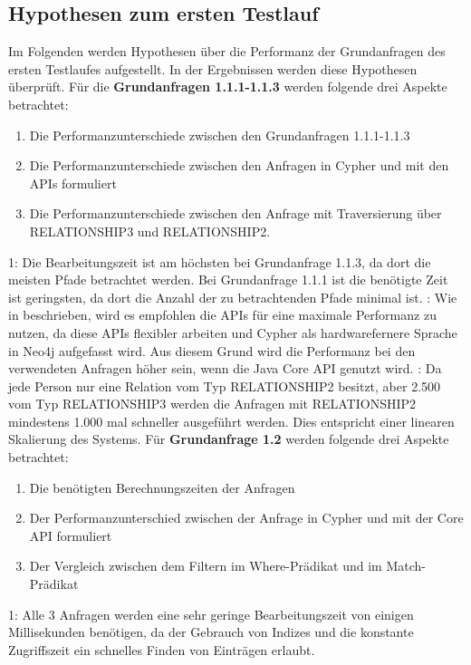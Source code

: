 \subsection{Hypothesen zum ersten Testlauf}
Im Folgenden werden Hypothesen über die Performanz der Grundanfragen des ersten Testlaufes aufgestellt. In der Ergebnissen werden diese Hypothesen überprüft. \newline \newline
Für die \textbf{Grundanfragen 1.1.1-1.1.3} werden folgende drei Aspekte betrachtet:
\begin{enumerate}
\item Die Performanzunterschiede zwischen den Grundanfragen 1.1.1-1.1.3
\item Die Performanzunterschiede zwischen den Anfragen in Cypher und mit den APIs formuliert
\item Die Performanzunterschiede zwischen den Anfrage mit Traversierung über RELATIONSHIP3 und RELATIONSHIP2.
\end{enumerate}
1: Die Bearbeitungszeit ist am höchsten bei Grundanfrage 1.1.3, da dort die meisten Pfade betrachtet werden. Bei Grundanfrage 1.1.1 ist die benötigte Zeit ist geringsten, da dort die Anzahl der zu betrachtenden Pfade minimal ist. : Wie in \parencite{raj2015neo4j} beschrieben, wird es empfohlen die APIs für eine maximale Performanz zu nutzen, da diese APIs flexibler arbeiten und Cypher als hardwarefernere Sprache in Neo4j aufgefasst wird. Aus diesem Grund wird die Performanz bei den verwendeten Anfragen höher sein, wenn die Java Core API genutzt wird. : Da jede Person nur eine Relation vom Typ RELATIONSHIP2 besitzt, aber 2.500 vom Typ RELATIONSHIP3 werden die Anfragen mit RELATIONSHIP2 mindestens 1.000 mal schneller ausgeführt werden. Dies entspricht einer linearen Skalierung des Systems. \newline \newline
Für \textbf{Grundanfrage 1.2} werden folgende drei Aspekte betrachtet:
\begin{enumerate}
	\item Die benötigten Berechnungszeiten der Anfragen 
	\item Der Performanzunterschied zwischen der Anfrage in Cypher und mit der Core API formuliert
	\item Der Vergleich zwischen dem Filtern im Where-Prädikat und im Match-Prädikat
\end{enumerate}
 1: Alle 3 Anfragen werden eine sehr geringe Bearbeitungszeit von einigen Millisekunden benötigen, da der Gebrauch von Indizes und die konstante Zugriffszeit ein schnelles Finden von Einträgen erlaubt. \newline
